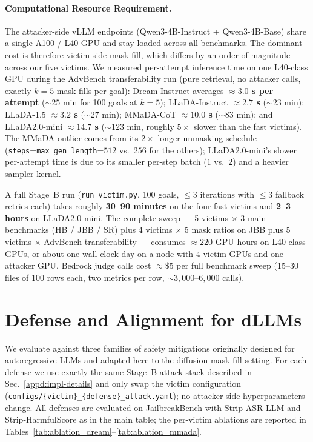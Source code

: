 \paragraph{Computational Resource Requirement.}
The attacker-side vLLM endpoints (Qwen3-4B-Instruct + Qwen3-4B-Base) share
a single A100 / L40 GPU and stay loaded across all benchmarks. The dominant
cost is therefore victim-side mask-fill, which differs by an order of
magnitude across our five victims. We measured per-attempt inference time
on one L40-class GPU during the AdvBench transferability run (pure
retrieval, no attacker calls, exactly $k{=}5$ mask-fills per goal):
Dream-Instruct averages \textbf{$\approx 3.0$ s per attempt}
($\sim 25$ min for 100 goals at $k{=}5$); LLaDA-Instruct
\textbf{$\approx 2.7$ s} ($\sim 23$ min); LLaDA-1.5
\textbf{$\approx 3.2$ s} ($\sim 27$ min); MMaDA-CoT
\textbf{$\approx 10.0$ s} ($\sim 83$ min); and LLaDA2.0-mini
\textbf{$\approx 14.7$ s} ($\sim 123$ min, roughly $5\times$ slower than
the fast victims). The MMaDA outlier comes from its $2\times$ longer
unmasking schedule (\texttt{steps}=\texttt{max\_gen\_length}=$512$ vs.\
$256$ for the others); LLaDA2.0-mini's slower per-attempt time is due to
its smaller per-step batch ($1$ vs.\ $2$) and a heavier sampler kernel.

A full Stage~B run (\texttt{run\_victim.py}, 100 goals, $\le 3$ iterations
with $\le 3$ fallback retries each) takes roughly
\textbf{30--90 minutes} on the four fast victims and \textbf{2--3 hours}
on LLaDA2.0-mini. The complete sweep ---
5 victims $\times$ 3 main benchmarks (HB / JBB / SR) plus 4 victims
$\times$ 5 mask ratios on JBB plus 5 victims $\times$ AdvBench
transferability --- consumes $\approx 220$ GPU-hours on L40-class GPUs,
or about one wall-clock day on a node with 4 victim GPUs and one
attacker GPU. Bedrock judge calls cost $\approx \$5$ per full benchmark
sweep (15--30 files of 100 rows each, two metrics per row,
$\sim 3{,}000$--$6{,}000$ calls).

\section{Defense and Alignment for dLLMs}\label{appd:defense}
We evaluate \method against three families of safety mitigations originally
designed for autoregressive LLMs and adapted here to the diffusion mask-fill
setting. For each defense we use exactly the same Stage~B attack stack
described in Sec.~\ref{appd:impl-details} and only swap the victim
configuration (\texttt{configs/\{victim\}\_\{defense\}\_attack.yaml}); no
attacker-side hyperparameters change. All defenses are evaluated on
JailbreakBench with Strip-ASR-LLM and Strip-HarmfulScore as in the main
table; the per-victim ablations are reported in
Tables~\ref{tab:ablation_dream}--\ref{tab:ablation_mmada}.

